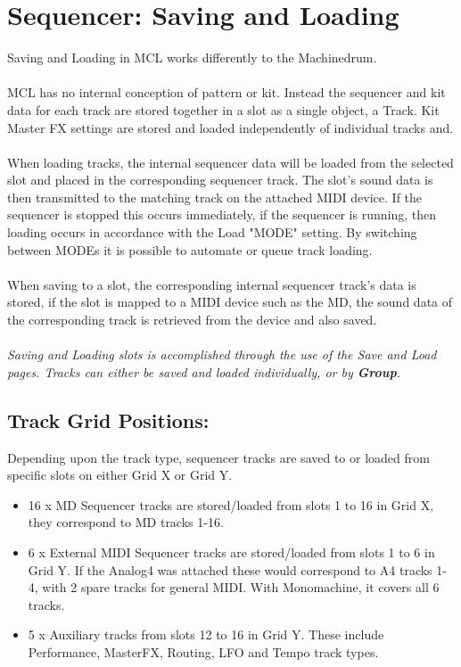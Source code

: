 \chapter{Sequencer: Saving and Loading}
Saving and Loading in MCL works differently to the Machinedrum. 
\\\\
MCL has no internal conception of pattern or kit. Instead the sequencer and kit data for each track are stored together in a slot as a single object, a Track. Kit Master FX settings are stored and loaded independently of individual tracks and.
\\\\
When loading tracks, the internal sequencer data will be loaded from the selected slot and placed in the corresponding sequencer track. The slot's sound data is then transmitted to the matching track on the attached MIDI device. If the sequencer is stopped this occurs immediately, if the sequencer is running, then loading occurs in accordance with the Load "MODE" setting. By switching between MODEs it is possible to automate or queue track loading.
\\\\
When saving to a slot, the corresponding internal sequencer track's data is stored, if the slot is mapped to a MIDI device such as the MD, the sound data of the corresponding track is retrieved from the device and also saved.\\
\\
\textit{Saving and Loading slots is accomplished through the use of the Save and Load pages.  Tracks can either be saved and loaded individually, or by \textbf{Group}.}

\section{Track Grid Positions:}
Depending upon the track type, sequencer tracks are saved to or loaded from specific slots on either Grid X or Grid Y.

\begin{itemize}
    \item 16 x MD Sequencer tracks are stored/loaded from slots 1 to 16 in Grid X, they correspond to MD tracks 1-16.
    \item 6 x External MIDI Sequencer tracks are stored/loaded from slots 1 to 6 in Grid Y. If the Analog4 was attached these would correspond to A4 tracks 1- 4, with 2 spare tracks for general MIDI. With Monomachine, it covers all 6 tracks.
    \item 5 x Auxiliary tracks from slots 12 to 16 in Grid Y. These include Performance, MasterFX, Routing, LFO and Tempo track types.
\end{itemize}

